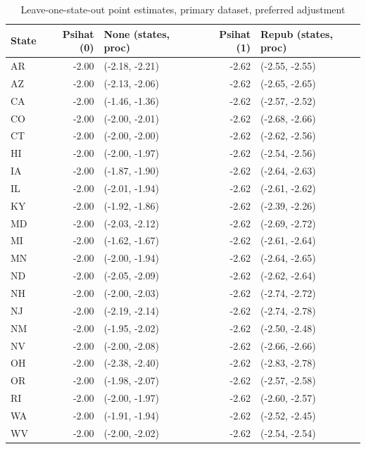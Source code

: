 \documentclass{article}
\begin{document}
\begin{appendix}
\begin{table}[ht]
\centering
   \caption{Leave-one-state-out point estimates, primary dataset, preferred adjustment}
    \label{tab:loostatec1}
\begin{tabular}{lrlrl}
  \hline
State & Psihat (0) & None (states, proc) & Psihat (1) & Repub (states, proc) \\ 
  \hline
AR & -2.00 & (-2.18, -2.21) & -2.62 & (-2.55, -2.55) \\ 
  AZ & -2.00 & (-2.13, -2.06) & -2.62 & (-2.65, -2.65) \\ 
  CA & -2.00 & (-1.46, -1.36) & -2.62 & (-2.57, -2.52) \\ 
  CO & -2.00 & (-2.00, -2.01) & -2.62 & (-2.68, -2.66) \\ 
  CT & -2.00 & (-2.00, -2.00) & -2.62 & (-2.62, -2.56) \\ 
  HI & -2.00 & (-2.00, -1.97) & -2.62 & (-2.54, -2.56) \\ 
  IA & -2.00 & (-1.87, -1.90) & -2.62 & (-2.64, -2.63) \\ 
  IL & -2.00 & (-2.01, -1.94) & -2.62 & (-2.61, -2.62) \\ 
  KY & -2.00 & (-1.92, -1.86) & -2.62 & (-2.39, -2.26) \\ 
  MD & -2.00 & (-2.03, -2.12) & -2.62 & (-2.69, -2.72) \\ 
  MI & -2.00 & (-1.62, -1.67) & -2.62 & (-2.61, -2.64) \\ 
  MN & -2.00 & (-2.00, -1.94) & -2.62 & (-2.64, -2.65) \\ 
  ND & -2.00 & (-2.05, -2.09) & -2.62 & (-2.62, -2.64) \\ 
  NH & -2.00 & (-2.00, -2.03) & -2.62 & (-2.74, -2.72) \\ 
  NJ & -2.00 & (-2.19, -2.14) & -2.62 & (-2.74, -2.78) \\ 
  NM & -2.00 & (-1.95, -2.02) & -2.62 & (-2.50, -2.48) \\ 
  NV & -2.00 & (-2.00, -2.08) & -2.62 & (-2.66, -2.66) \\ 
  OH & -2.00 & (-2.38, -2.40) & -2.62 & (-2.83, -2.78) \\ 
  OR & -2.00 & (-1.98, -2.07) & -2.62 & (-2.57, -2.58) \\ 
  RI & -2.00 & (-2.00, -1.97) & -2.62 & (-2.60, -2.57) \\ 
  WA & -2.00 & (-1.91, -1.94) & -2.62 & (-2.52, -2.45) \\ 
  WV & -2.00 & (-2.00, -2.02) & -2.62 & (-2.54, -2.54) \\ 
   \hline
\end{tabular}
\end{table}


\end{appendix}
\end{document}
